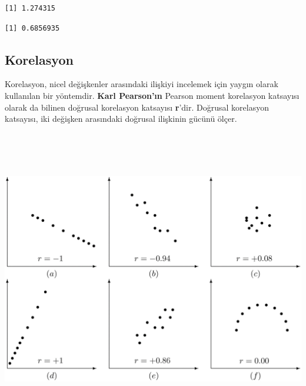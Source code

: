 \documentclass[
  letterpaper,
  DIV=11,
  numbers=noendperiod]{scrreprt}
\newenvironment{Shaded}{\begin{snugshade}}{\end{snugshade}}
\newcommand{\CommentTok}[1]{\textcolor[rgb]{0.37,0.37,0.37}{#1}}
\newcommand{\FunctionTok}[1]{\textcolor[rgb]{0.28,0.35,0.67}{#1}}
\newcommand{\NormalTok}[1]{\textcolor[rgb]{0.00,0.23,0.31}{#1}}
\newcommand{\SpecialCharTok}[1]{\textcolor[rgb]{0.37,0.37,0.37}{#1}}
\begin{document}
\begin{Shaded}
\end{Shaded}

\begin{verbatim}
[1] 1.274315
\end{verbatim}

\begin{Shaded}
\end{Shaded}

\begin{verbatim}
[1] 0.6856935
\end{verbatim}

\subsection*{Korelasyon}\label{korelasyon}

Korelasyon, nicel değişkenler arasındaki ilişkiyi incelemek için yaygın
olarak kullanılan bir yöntemdir. \textbf{Karl Pearson'ın} Pearson moment
korelasyon katsayısı olarak da bilinen doğrusal korelasyon katsayısı
\textbf{r}'dir. Doğrusal korelasyon katsayısı, iki değişken arasındaki
doğrusal ilişkinin gücünü ölçer.

\begin{center}
\includegraphics[width=7.6875in,height=5.15625in]{images/korelasyon.png}
\end{center}
\end{document}
